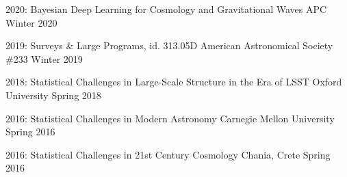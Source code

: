 \documentclass[11pt,letterpaper]{article}
\begin{document}
\begin{list}{}{\malzlist}
\item 2020: 
	{Bayesian Deep Learning for Cosmology and Gravitational Waves}
	{APC}%
	{Winter 2020}
\item 2019: 
	{Surveys \& Large Programs, id. 313.05D}
	{American Astronomical Society \#233}
	{Winter 2019}
\item 2018: 
		{Statistical Challenges in Large-Scale Structure in the Era of LSST}
	{Oxford University}
	{Spring 2018}
\item 2016: 
	{Statistical Challenges in Modern Astronomy}
	{Carnegie Mellon University}
	{Spring 2016}
\item 2016: 
	{Statistical Challenges in 21st Century Cosmology}
	{Chania, Crete}
	{Spring 2016}
\end{list}
%
\end{document}
